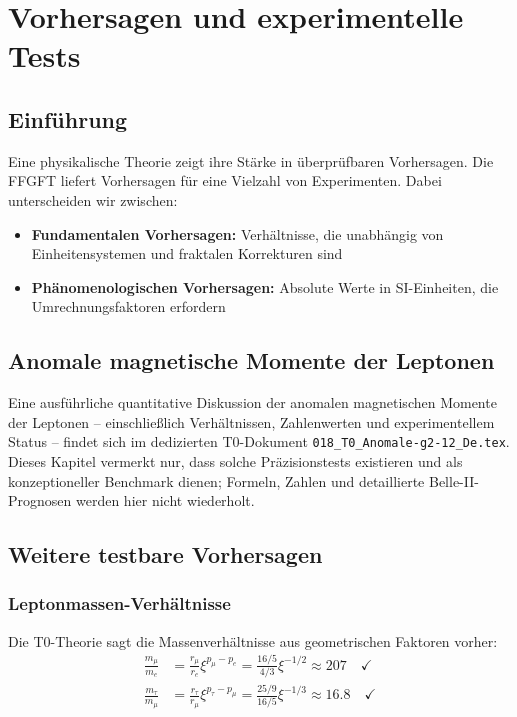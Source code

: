 
\chapter{Vorhersagen und experimentelle Tests}

\section{Einführung}

Eine physikalische Theorie zeigt ihre Stärke in überprüfbaren Vorhersagen. Die 
FFGFT liefert Vorhersagen für eine Vielzahl von Experimenten. Dabei unterscheiden 
wir zwischen:

\begin{itemize}
	\item \textbf{Fundamentalen Vorhersagen:} Verhältnisse, die unabhängig von 
	Einheitensystemen und fraktalen Korrekturen sind
	\item \textbf{Phänomenologischen Vorhersagen:} Absolute Werte in SI-Einheiten, 
	die Umrechnungsfaktoren erfordern
\end{itemize}

\section{Anomale magnetische Momente der Leptonen}

Eine ausführliche quantitative Diskussion der anomalen magnetischen Momente der Leptonen – einschließlich Verhältnissen, Zahlenwerten und experimentellem Status – findet sich im dedizierten T0-Dokument \texttt{018\_T0\_Anomale-g2-12\_De.tex}.
Dieses Kapitel vermerkt nur, dass solche Präzisionstests existieren und als konzeptioneller Benchmark dienen; Formeln, Zahlen und detaillierte Belle-II-Prognosen werden hier nicht wiederholt.


\section{Weitere testbare Vorhersagen}

\subsection{Leptonmassen-Verhältnisse}

Die T0-Theorie sagt die Massenverhältnisse aus geometrischen Faktoren vorher:
\begin{align}
	\frac{m_\mu}{m_e} &= \frac{r_\mu}{r_e} \xi^{p_\mu - p_e} = \frac{16/5}{4/3} \xi^{-1/2} 
	\approx 207 \quad \checkmark \\
	\frac{m_\tau}{m_\mu} &= \frac{r_\tau}{r_\mu} \xi^{p_\tau - p_\mu} = \frac{25/9}{16/5} \xi^{-1/3} 
	\approx 16.8 \quad \checkmark
\end{align}

